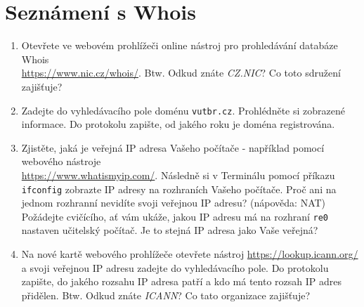 \section{Seznámení s Whois}
\begin{enumerate}
    \item Otevřete ve webovém prohlížeči online nástroj pro prohledávání databáze Whois\\ \url{https://www.nic.cz/whois/}. Btw. Odkud znáte \emph{CZ.NIC}? Co toto sdružení zajišťuje?
    \item Zadejte do vyhledávacího pole doménu \texttt{vutbr.cz}. Prohlédněte si zobrazené informace. Do protokolu zapište, od jakého roku je doména registrována.
    \item Zjistěte, jaká je veřejná IP adresa Vašeho počítače - například pomocí webového nástroje\\ \url{https://www.whatismyip.com/}. Následně si v Terminálu pomocí příkazu \texttt{ifconfig} zobrazte IP adresy na rozhraních Vašeho počítače. Proč ani na jednom rozhranní nevidíte svoji veřejnou IP adresu? (nápověda: NAT) Požádejte cvičícího, ať vám ukáže, jakou IP adresu má na rozhraní \texttt{re0} nastaven učitelský počítač. Je to stejná IP adresa jako Vaše veřejná?
    \item Na nové kartě webového prohlížeče otevřete nástroj \url{https://lookup.icann.org/} a svoji veřejnou IP adresu zadejte do vyhledávacího pole. Do protokolu zapište, do jakého rozsahu IP adresa patří a kdo má tento rozsah IP adres přidělen. Btw. Odkud znáte \emph{ICANN}? Co tato organizace zajišťuje?
\end{enumerate}


